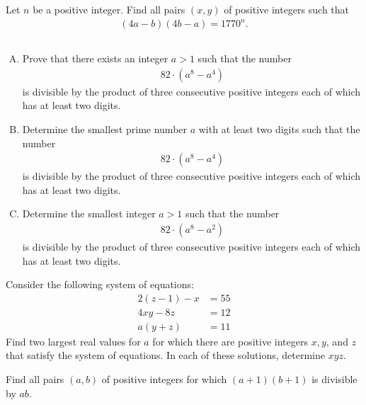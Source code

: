 \documentclass[problems.tex]{subfile}
\begin{document}
	\begin{problem}
		Let $n$ be a positive integer. Find all pairs $(x,y)$ of positive integers such that
		\begin{align*}
			(4a-b)(4b-a)=1770^n.
		\end{align*}
	\end{problem}


	\begin{problem} $ $
		\begin{enumerate}[(A)]
			\item Prove that there exists an integer $a>1$ such that the number
			\begin{align*}
				82 \cdot \left(a^8 - a^4\right)
			\end{align*}
			is divisible by the product of three consecutive positive integers each of which has at least two digits.
			\item Determine the smallest prime number $a$ with at least two digits such that the number
			\begin{align*}
				82 \cdot \left(a^8 - a^4\right)
			\end{align*}
			is divisible by the product of three consecutive positive integers each of which has at least two digits.
			\item Determine the smallest integer $a>1$ such that the number
			\begin{align*}
				82 \cdot \left(a^8 - a^2\right)
			\end{align*}
			is divisible by the product of three consecutive positive integers each of which has at least two digits.
		\end{enumerate}
	\end{problem}

	\begin{problem}
		Consider the following system of equations:
		\begin{align*}
			2(z-1) - x &= 55\\
			4xy - 8z   &= 12\\
			a(y+z)     &= 11
		\end{align*}
		Find two largest real values for $a$ for which there are positive integers $x, y$, and $z$ that satisfy the system of equations. In each of these solutions, determine $xyz$.
	\end{problem}

	\begin{problem}
		Find all pairs $(a, b)$ of positive integers for which $(a + 1) (b + 1)$ is divisible by $ab$.
	\end{problem}
\end{document}
